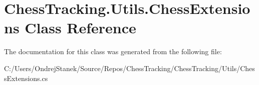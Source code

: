 \hypertarget{class_chess_tracking_1_1_utils_1_1_chess_extensions}{}\section{Chess\+Tracking.\+Utils.\+Chess\+Extensions Class Reference}
\label{class_chess_tracking_1_1_utils_1_1_chess_extensions}


The documentation for this class was generated from the following file\+:\begin{DoxyCompactItemize}
\item 
C\+:/\+Users/\+Ondrej\+Stanek/\+Source/\+Repos/\+Chess\+Tracking/\+Chess\+Tracking/\+Utils/Chess\+Extensions.\+cs\end{DoxyCompactItemize}
